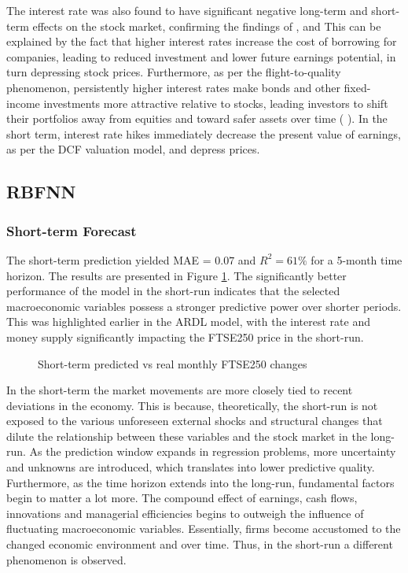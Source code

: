 \documentclass[11pt,a4paper]{article}
\newcommand{\citeboth}[1]{\citeauthor{#1} \citep{#1}}
\begin{document}
The interest rate was also found to have significant negative long-term and short-term effects on the stock market, confirming the findings of \citeboth{alam2009}, \citeboth{demir2019} and \citeboth{neifar2023}
This can be explained by the fact that higher interest 
rates increase the cost of borrowing for companies, leading to reduced investment 
and lower future earnings potential, in turn depressing stock prices. 
Furthermore, as per the flight-to-quality phenomenon, persistently higher interest rates make bonds and other fixed-income 
investments more attractive relative to stocks, leading investors to shift 
their portfolios away from equities and toward safer assets over time (\citeboth{asgharian2016}). 
In the short term, interest rate hikes immediately decrease the present value of earnings, as per the 
DCF valuation model, and depress prices.





\subsection{RBFNN}

\subsubsection{Short-term Forecast}


The short-term prediction yielded MAE = $0.07$ and 
$R^2 = 61\%$ for a 5-month time horizon. The results are presented in Figure \ref{fig:shortmonthly}.
The significantly better performance of the model in the short-run
indicates that the selected macroeconomic variables possess
a stronger predictive power over shorter periods. This was highlighted 
earlier in the ARDL model, with the interest rate and money supply significantly
impacting the FTSE250 price in the short-run.



\begin{figure}[H]
    \centering
    \hspace*{-1.5cm}
      
    \caption{Short-term predicted vs real monthly FTSE250 changes}
    \label{fig:shortmonthly}
\end{figure}



In the short-term the market movements
are more closely tied to recent deviations in the economy. This is because,
theoretically, 
the short-run is not exposed to the various unforeseen external shocks and structural changes
that dilute the relationship between these variables and the stock market in the 
long-run. As the prediction window expands in regression problems, 
more uncertainty and unknowns are introduced, which translates into 
lower predictive quality. Furthermore, as the time horizon extends into the long-run, fundamental factors 
begin to matter a lot more. The compound effect of earnings, cash flows,
innovations and managerial efficiencies begins to outweigh the 
influence of fluctuating macroeconomic variables. Essentially, firms become accustomed 
to the changed economic environment and over time. Thus, in the short-run 
a different phenomenon is observed.
\end{document}
